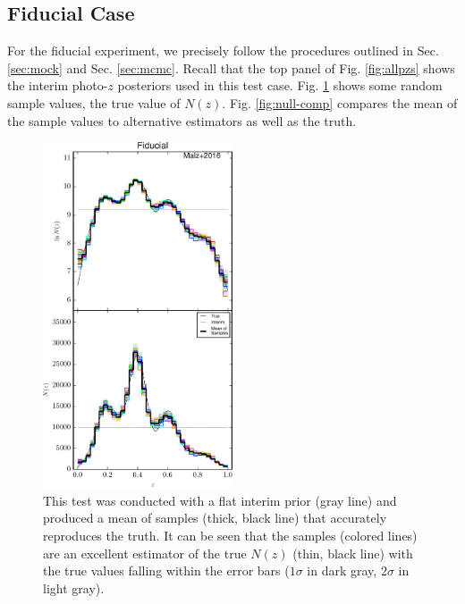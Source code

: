 \documentclass[preprint]{aastex}
\begin{document}
\subsection{Fiducial Case}
\label{sec:null}

For the fiducial experiment, we precisely follow the procedures outlined in 
Sec. \ref{sec:mock} and Sec. \ref{sec:mcmc}.  Recall that the top panel of Fig. 
\ref{fig:allpzs} shows the interim photo-$z$ posteriors used in this test case. 
 Fig. \ref{fig:null-samp} shows some random sample values, the true value of 
$N(z)$.  Fig. \ref{fig:null-comp} compares the mean of the sample values to 
alternative estimators as well as the truth.

\begin{figure}
\includegraphics[width=0.5\textwidth]{figs/null/samps.pdf}
\caption{This test was conducted with a flat interim prior (gray line) and 
produced a mean of samples (thick, black line) that accurately reproduces the 
truth.  It can be seen that the samples (colored lines) are an excellent 
estimator of the true $N(z)$ (thin, black line) with the true values falling 
within the error bars ($1\sigma$ in dark gray, $2\sigma$ in light gray).}
\label{fig:null-samp}
\end{figure}
\end{document}
